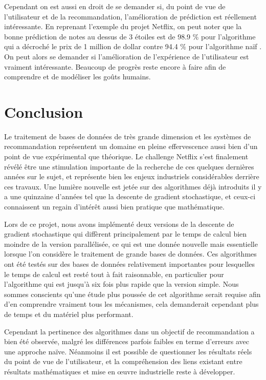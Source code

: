 \documentclass[10pt,a4paper]{article}
\begin{document}
Cependant on est aussi en droit de se demander si, du point de vue de l'utilisateur et de la recommandation, l'amélioration de prédiction est réellement intéressante. En reprenant l'exemple du projet Netflix, on peut noter que la bonne prédiction de notes au dessus de 3 étoiles est de 98.9 $\%$ pour l'algorithme qui a décroché le prix de 1 million de dollar contre 94.4 $\%$ pour l'algorithme naïf \cite{blog}. On peut alors se demander si l'amélioration de l'expérience de l'utilisateur est vraiment intéressante. Beaucoup de progrès reste encore à faire afin de comprendre et de modéliser les goûts humains.

\section*{Conclusion}
Le traitement de bases de données de très grande dimension et les systèmes de recommandation représentent un domaine en pleine effervescence aussi bien d'un point de vue expérimental que théorique. Le challenge Netflix s'est finalement révélé être une stimulation importante de la recherche de ces quelques dernières années sur le sujet, et représente bien les enjeux industriels considérables derrière ces travaux. Une lumière nouvelle est jetée sur des algorithmes déjà introduits il y a une quinzaine d'années tel que la descente de gradient stochastique, et ceux-ci connaissent un regain d'intérêt aussi bien pratique que mathématique.

Lors de ce projet, nous avons implémenté deux versions de la descente de gradient stochastique qui diffèrent principalement par le temps de calcul bien moindre de la version parallélisée, ce qui est une donnée nouvelle mais essentielle lorsque l'on considère le traitement de grande bases de données. Ces algorithmes ont été testés sur des bases de données relativement importantes pour lesquelles le temps de calcul est resté tout à fait raisonnable, en particulier pour l'algorithme \jel qui est jusqu'à six fois plus rapide que la version simple. Nous sommes conscients qu'une étude plus poussée de cet algorithme serait requise afin d'en comprendre vraiment tous les mécanismes, cela demanderait cependant plus de temps et du matériel plus performant. 

Cependant la pertinence des algorithmes dans un objectif de recommandation a bien été observée, malgré les différences parfois faibles en terme d'erreurs avec une approche naïve. Néanmoins il est possible de questionner les résultats réels du point de vue de l'utilisateur, et la compréhension des liens existant entre résultats mathématiques et mise en œuvre industrielle reste à développer.



\end{document}
